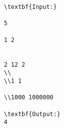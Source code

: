 \begin{verbatim}
\textbf{Input:}

5

1 2


2 12 2
\\
\\1 1

\\1000 1000000

\textbf{Output:}
4
\end{verbatim}